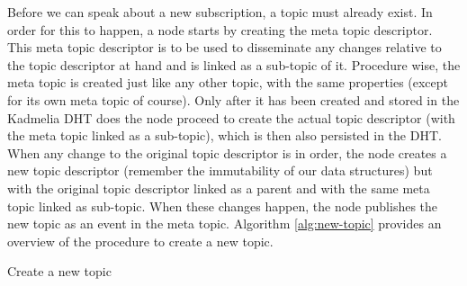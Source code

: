 Before we can speak about a new subscription, a topic must already exist. In
order for this to happen, a node starts by creating the meta topic descriptor.
This meta topic descriptor is to be used to disseminate any changes relative to
the topic descriptor at hand and is linked as a sub-topic of it. Procedure
wise, the meta topic is created just like any other topic, with the same
properties (except for its own meta topic of course). Only after it has been
created and stored in the Kadmelia DHT does the node proceed to
create the actual topic descriptor (with the meta topic linked as a sub-topic),
which is then also persisted in the DHT. When any change to the
original topic descriptor is in order, the node creates a new topic descriptor
(remember the immutability of our data structures) but with the original topic
descriptor linked as a parent and with the same meta topic linked as sub-topic.
When these changes happen,  the node publishes the new topic as an event in the
meta topic.  Algorithm \ref{alg:new-topic} provides an overview of the
procedure to create a new topic.


\begin{algorithm}
  \SetAlgoLined
  \caption{Create a new topic}
	\label{alg:new-topic}
\end{algorithm}

